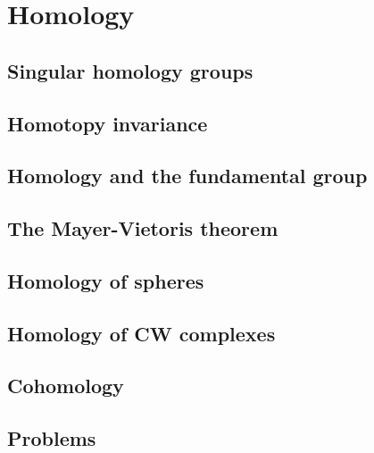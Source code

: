 \chapter{Homology}
\section{Singular homology groups}
\section{Homotopy invariance}
\section{Homology and the fundamental group}
\section{The Mayer-Vietoris theorem}
\section{Homology of spheres}
\section{Homology of CW complexes}
\section{Cohomology}
\section{Problems}

